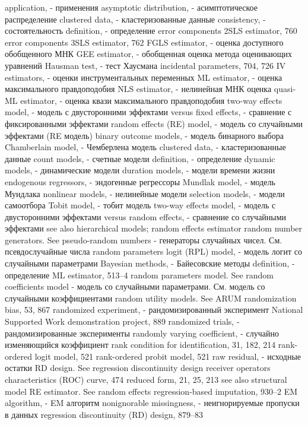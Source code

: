 application, - применения
asymptotic distribution, - асимптотическое распределение
clustered data, - кластеризованные данные
consistency, - состоятельность
definition, - определение
error components 2SLS estimator, 760 error components 3SLS estimator, 762 
FGLS estimator, -  оценка доступного обобщенного МНК
GEE estimator, - обобщенная оценка метода оценивающих уравнений 
Hausman test, - тест Хаусмана
incidental parameters, 704, 726
IV estimators, - оценки инструментальных переменных
ML estimator, - оценка максимального правдоподобия
NLS estimator, - нелинейная МНК оценка
quasi-ML estimator, - оценка квази максимального правдоподобия
two-way effects model, - модель с двусторонними эффектами
versus fixed effects, - сравнение с фиксированными эффектами
random effects (RE) model, - модель со случайными эффектами (RE модель)
binary outcome models, - модель бинарного выбора
Chamberlain model, - Чемберлена модель
clustered data, - кластеризованные данные
count models, - счетные модели 
definition, - определение
dynamic models, - динамические модели
duration models, - модели времени жизни
endogenous regressors, - эндогенные регрессоры
Mundlak model, - модель Мундлака
nonlinear models, - нелинейные модели
selection models, - модели самоотбора
Tobit model, - тобит модель 
two-way effects model, - модель с двусторонними эффектами
versus random effects, - сравнение со случайными эффектами
see also hierarchical models; random effects
estimator
random number generators. See pseudo-random numbers - генераторы случайных чисел. См. псевдослучайные числа
random parameters logit (RPL) model, - модель логит со случайными параметрами
Bayesian methods, - Байесовские методы
definition, - определение
ML estimator, 513–4
random parameters model. See random coefficients model - модель со случайными параметрами. См. модель со случайными коэффициентами
random utility models. See ARUM randomization bias, 53, 867 
randomized experiment, - рандомизированный эксперимент
National Supported Work demonstration project, 889
randomized trials, - рандомизированные эксперименты
randomly varying coefficient, - случайно изменяющийся коэффициент
rank condition for identification, 31, 182, 214 rank-ordered logit model, 521
rank-ordered probit model, 521
raw residual, - исходные остатки
RD design. See regression discontinuity design receiver operators characteristics (ROC) curve, 474 reduced form, 21, 25, 213
see also structural model
RE estimator. See random effects regression-based imputation, 930–2
EM algorithm, - EM алгоритм
nonignorable missingness, - неигнорируемые пропуски в данных
regression discontinuity (RD) design, 879–83
